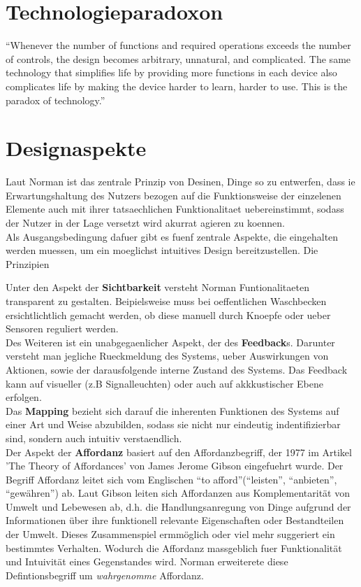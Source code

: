\documentclass[parskip,headsepline, headtopline, %
footsepline, oneside, 12pt, headings=small]{scrreprt}
\begin{document}
\section{Technologieparadoxon}

“Whenever the number of functions and required operations exceeds the number of controls, the design becomes arbitrary, unnatural, and complicated. 
	The same technology that simplifies life by providing more functions in each device also complicates life by making the device harder to learn, harder to use. This is the paradox of technology.”

\section{Designaspekte}
\label{sec:aspekte}

Laut Norman ist das zentrale Prinzip von Desinen, Dinge so zu entwerfen, dass ie Erwartungshaltung des Nutzers bezogen auf die Funktionsweise der einzelenen Elemente auch mit ihrer tatsaechlichen Funktionalitaet uebereinstimmt, sodass der Nutzer in der Lage versetzt wird akurrat agieren zu koennen.\\ 
Als Ausgangsbedingung dafuer gibt es fuenf zentrale Aspekte, die eingehalten werden muessen, um  ein moeglichst intuitives Design bereitzustellen. Die Prinzipien 
	
Unter den Aspekt der \textbf{Sichtbarkeit} versteht Norman Funtionalitaeten transparent zu gestalten. Beipielsweise muss bei oeffentlichen Waschbecken ersichtlichtlich gemacht werden, ob diese manuell durch Knoepfe oder ueber Sensoren reguliert werden.\\
   
Des Weiteren ist ein unabgegaenlicher Aspekt, der des \textbf{Feedback}s. Darunter versteht man jegliche Rueckmeldung des Systems, ueber Auswirkungen von Aktionen, sowie der darausfolgende interne Zustand des Systems. Das Feedback kann auf visueller (z.B Signalleuchten) oder auch auf akkkustischer Ebene erfolgen.\\
 
Das	\textbf{Mapping} bezieht sich darauf die inherenten Funktionen des Systems auf einer Art und Weise abzubilden, sodass sie nicht nur eindeutig indentifizierbar sind, sondern auch intuitiv verstaendlich.\\

Der Aspekt der \textbf{Affordanz} basiert auf den Affordanzbegriff, der 1977 im Artikel 'The Theory of Affordances' von James Jerome Gibson eingefuehrt wurde. Der Begriff Affordanz leitet sich vom Englischen “to afford”(“leisten”, “anbieten”, “gewähren”) ab. Laut Gibson leiten sich Affordanzen aus Komplementarität von Umwelt und Lebewesen ab, d.h.  
die Handlungsanregung von Dinge aufgrund der Informationen über ihre funktionell relevante Eigenschaften oder Bestandteilen der Umwelt. Dieses Zusammenspiel ermmöglich oder viel mehr suggeriert ein bestimmtes Verhalten. Wodurch die Affordanz massgeblich fuer Funktionalität und Intuivität eines Gegenstandes wird.
Norman erweiterete diese Defintionsbegriff um \textit{wahrgenomme} Affordanz.
\end{document}
